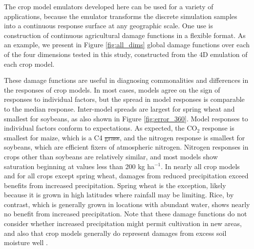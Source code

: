 \documentclass[gmdd]{copernicus} %
\providecommand{\DIFadd}[1]{{\protect\color{blue}\uwave{#1}}} %
\providecommand{\DIFdel}[1]{{\protect\color{red}\sout{#1}}}                      %
\providecommand{\DIFaddbegin}{} %
\providecommand{\DIFaddend}{} %
\providecommand{\DIFdelbegin}{} %
\providecommand{\DIFdelend}{} %
\begin{document}
The crop model emulators developed here can be used for a variety of applications, because the emulator transforms the discrete simulation samples into a continuous response surface at any geographic scale. One use is construction of continuous agricultural damage functions in a flexible format. 
As an example, we present in Figure \ref{fig:all_dims} global damage functions over each of the four dimensions tested in this study, constructed from the 4D emulation of each crop model.

These damage functions are useful in diagnosing commonalities and differences in the responses of crop models. 
In most cases, models agree on the sign of responses to individual factors, but the spread in model responses is comparable to the median response. Inter-model spreads are largest for spring wheat and smallest for soybeans, as also shown in Figure \ref{fig:error_360}.
Model responses to individual factors conform to expectations. As expected, the CO$_2$ response is smallest for maize, which is a C4 \DIFdelbegin \DIFdel{grass}\DIFdelend \DIFaddbegin \DIFadd{crop}\DIFaddend , and the nitrogen response is smallest for soybeans, which are efficient fixers of atmospheric nitrogen. Nitrogen responses in crops other than soybeans are relatively similar, and most models show saturation beginning at values less than 200 kg ha$^{-1}$.
In nearly all crop models and for all crops except spring wheat, damages from reduced precipitation exceed benefits from increased precipitation. Spring wheat is the exception, likely because it is grown in high latitudes where rainfall may be limiting. Rice, by contrast, which is generally grown in locations with abundant water, shows nearly no benefit from increased precipitation.
Note that these damage functions do not consider whether increased precipitation might permit cultivation in new areas, and also that crop models generally do represent damages from excess soil moisture well \citep{Li2019}.
\end{document}
